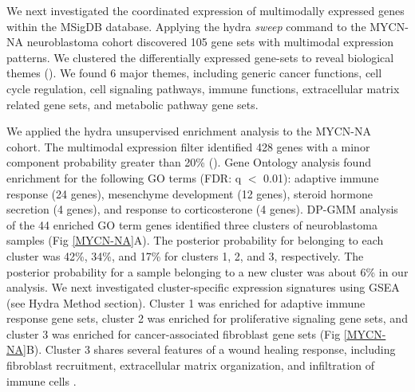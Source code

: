 \documentclass[10pt,letterpaper]{article}
\begin{document}
We next investigated the coordinated expression of multimodally expressed genes within the MSigDB database. Applying the hydra \textit{sweep} command to the MYCN-NA neuroblastoma cohort discovered 105 gene sets with multimodal expression patterns. We clustered the differentially expressed gene-sets to reveal biological themes (). We found 6 major themes, including generic cancer functions, cell cycle regulation, cell signaling pathways, immune functions, extracellular matrix related gene sets, and metabolic pathway gene sets.

We applied the hydra unsupervised enrichment analysis to the MYCN-NA cohort. The multimodal expression filter identified 428 genes with a minor component probability greater than 20\% (). Gene Ontology analysis found enrichment for the following GO terms (FDR: q $<$ 0.01): adaptive immune response (24 genes), mesenchyme development (12 genes), steroid hormone secretion (4 genes), and response to corticosterone (4 genes). DP-GMM analysis of the 44 enriched GO term genes identified three clusters of neuroblastoma samples (Fig \ref{MYCN-NA}A). The posterior probability for belonging to each cluster was 42\%, 34\%, and 17\% for clusters 1, 2, and 3, respectively. The posterior probability for a sample belonging to a new cluster was about 6\% in our analysis. We next investigated cluster-specific expression signatures using GSEA (see Hydra Method section). Cluster 1 was enriched for adaptive immune response gene sets, cluster 2 was enriched for proliferative signaling gene sets, and cluster 3 was enriched for cancer-associated fibroblast gene sets (Fig \ref{MYCN-NA}B). Cluster 3 shares several features of a wound healing response, including fibroblast recruitment, extracellular matrix organization, and infiltration of immune cells \cite{fosterEvolvingRelationshipWound}. 
\end{document}
